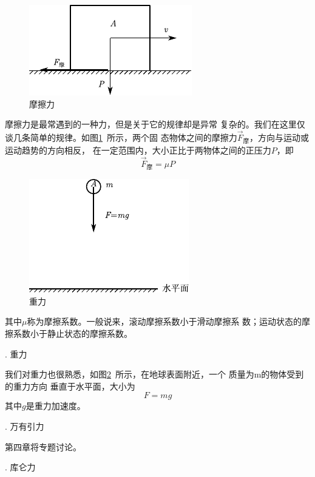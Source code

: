 \begin{figure}
    \includegraphics{figure/fig03.04}
    \caption{摩擦力}
    \label{fig:03.04}
\end{figure}
摩擦力是最常遇到的一种力，但是关于它的规律却是异常
复杂的。我们在这里仅谈几条简单的规律。如图\ref{fig:03.04}~所示，两个固
态物体之间的摩擦力$ \vec{F}_\text{摩} $，方向与运动或运动趋势的方向相反，
在一定范围内，大小正比于两物体之间的正压力$ P $，即\vspace{-0.2em}
\begin{equation}\label{eqn:03.04.02}
    \vec{F}_\text{摩} = \mu P
\end{equation}

\begin{figure}
    \includegraphics{figure/fig03.05}
    \caption{重力}
    \label{fig:03.05}
\end{figure}
\noindent 其中$\mu$称为摩擦系数。一般说来，滚动摩擦系数小于滑动摩擦系
数；运动状态的摩擦系数小于静止状态的摩擦系数。

. 重力 \normalfont

我们对重力也很熟悉，如图\ref{fig:03.05}~所示，在地球表面附近，一个
质量为m的物体受到的重力方向
垂直于水平面，大小为
\begin{equation}\label{eqn:03.04.03}
    F = m g
\end{equation}
其中$ g $是重力加速度。

. 万有引力 \normalfont

第四章将专题讨论。

. 库仑力 \normalfont


